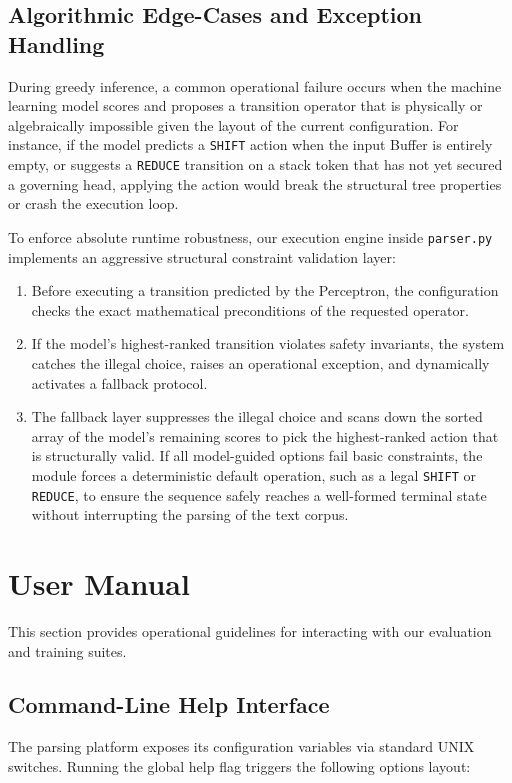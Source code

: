 \documentclass[12pt,a4paper]{article}
\begin{document}
\subsection{Algorithmic Edge-Cases and Exception Handling}
During greedy inference, a common operational failure occurs when the machine learning model scores and proposes a transition operator that is physically or algebraically impossible given the layout of the current configuration. For instance, if the model predicts a \texttt{SHIFT} action when the input Buffer is entirely empty, or suggests a \texttt{REDUCE} transition on a stack token that has not yet secured a governing head, applying the action would break the structural tree properties or crash the execution loop.

To enforce absolute runtime robustness, our execution engine inside \texttt{parser.py} implements an aggressive structural constraint validation layer:
\begin{enumerate}
    \item Before executing a transition predicted by the Perceptron, the configuration checks the exact mathematical preconditions of the requested operator.
    \item If the model's highest-ranked transition violates safety invariants, the system catches the illegal choice, raises an operational exception, and dynamically activates a fallback protocol.
    \item The fallback layer suppresses the illegal choice and scans down the sorted array of the model's remaining scores to pick the highest-ranked action that is structurally valid. If all model-guided options fail basic constraints, the module forces a deterministic default operation, such as a legal \texttt{SHIFT} or \texttt{REDUCE}, to ensure the sequence safely reaches a well-formed terminal state without interrupting the parsing of the text corpus.
\end{enumerate}
\section{User Manual}
\label{sec:user_manual}

This section provides operational guidelines for interacting with our evaluation and training suites.

\subsection{Command-Line Help Interface}
The parsing platform exposes its configuration variables via standard UNIX switches. Running the global help flag triggers the following options layout:
\end{document}
